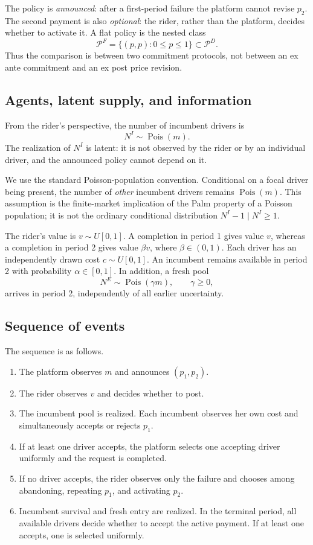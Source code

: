 \documentclass[11pt]{article}
\theoremstyle{definition}
\theoremstyle{remark}
\begin{document}
The policy is \emph{announced}: after a first-period failure the platform
cannot revise \(p_2\).  The second payment is also \emph{optional}: the rider,
rather than the platform, decides whether to activate it.  A flat policy is the
nested class
\[
  \mathcal P^F=\{(p,p):0\le p\le1\}\subset\mathcal P^D.
\]
Thus the comparison is between two commitment protocols, not between an ex
ante commitment and an ex post price revision.

\subsection{Agents, latent supply, and information}

From the rider's perspective, the number of incumbent drivers is
\[
  N^I\sim\operatorname{Pois}(m).
\]
The realization of \(N^I\) is latent: it is not observed by the rider or by an
individual driver, and the announced policy cannot depend on it.

We use the standard Poisson-population convention.  Conditional on a focal
driver being present, the number of \emph{other} incumbent drivers remains
\(\operatorname{Pois}(m)\).  This assumption is the finite-market implication
of the Palm property of a Poisson population; it is not the ordinary
conditional distribution \(N^I-1\mid N^I\ge1\).

The rider's value is \(v\sim U[0,1]\).  A completion in period 1 gives value
\(v\), whereas a completion in period 2 gives value \(\beta v\), where
\(\beta\in(0,1)\).  Each driver has an independently drawn cost
\(c\sim U[0,1]\).  An incumbent remains available in period 2 with probability
\(\alpha\in[0,1]\).  In addition, a fresh pool
\[
  N^E\sim\operatorname{Pois}(\gamma m),\qquad \gamma\ge0,
\]
arrives in period 2, independently of all earlier uncertainty.

\subsection{Sequence of events}

The sequence is as follows.

\begin{enumerate}[label=\arabic*.]
  \item The platform observes \(m\) and announces \((p_1,p_2)\).
  \item The rider observes \(v\) and decides whether to post.
  \item The incumbent pool is realized.  Each incumbent observes her own cost
        and simultaneously accepts or rejects \(p_1\).
  \item If at least one driver accepts, the platform selects one accepting
        driver uniformly and the request is completed.
  \item If no driver accepts, the rider observes only the failure and chooses
        among abandoning, repeating \(p_1\), and activating \(p_2\).
  \item Incumbent survival and fresh entry are realized.  In the terminal
        period, all available drivers decide whether to accept the active
        payment.  If at least one accepts, one is selected uniformly.
\end{enumerate}
\end{document}
